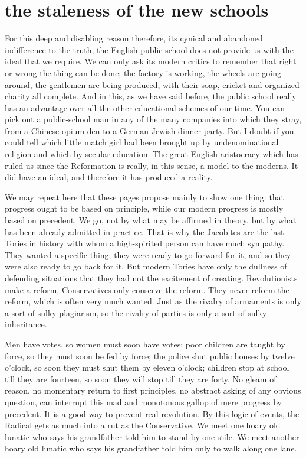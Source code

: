\documentclass[final,10pt,letterpaper,twocolumn,openany]{book}
\begin{document}
\section{the staleness of the new schools}

     For this deep and disabling reason therefore, its cynical and abandoned
indifference to the truth, the English public school does not provide us
with the ideal that we require. We can only ask its modern critics to
remember that right or wrong the thing can be done; the factory is working,
the wheels are going around, the gentlemen are being produced, with their
soap, cricket and organized charity all complete. And in this, as we have
said before, the public school really has an advantage over all the other
educational schemes of our time. You can pick out a public-school man in
any of the many companies into which they stray, from a Chinese opium
den to a German Jewish dinner-party. But I doubt if you could tell which
little match girl had been brought up by undenominational religion and
which by secular education. The great English aristocracy which has ruled
us since the Reformation is really, in this sense, a model to the moderns. It
did have an ideal, and therefore it has produced a reality.

We may repeat here that these pages propose mainly to show one thing:
that progress ought to be based on principle, while our modern progress is
mostly based on precedent. We go, not by what may be affirmed in theory,
but by what has been already admitted in practice. That is why the
Jacobites are the last Tories in history with whom a high-spirited person
can have much sympathy. They wanted a specific thing; they were ready
to go forward for it, and so they were also ready to go back for it. But
modern Tories have only the dullness of defending situations that they had
not the excitement of creating. Revolutionists make a reform,
Conservatives only conserve the reform. They never reform the reform,
which is often very much wanted. Just as the rivalry of armaments is only
a sort of sulky plagiarism, so the rivalry of parties is only a sort of sulky
inheritance. 

Men have votes, so women must soon have votes; poor
children are taught by force, so they must soon be fed by force; the police
shut public houses by twelve o'clock, so soon they must shut them by
eleven o'clock; children stop at school till they are fourteen, so soon they
will stop till they are forty. No gleam of reason, no momentary return to
first principles, no abstract asking of any obvious question, can interrupt
this mad and monotonous gallop of mere progress by precedent. It is a
good way to prevent real revolution. By this logic of events, the Radical
gets as much into a rut as the Conservative. We meet one hoary old lunatic
who says his grandfather told him to stand by one stile. We meet another
hoary old lunatic who says his grandfather told him only to walk along
one lane.
\end{document}
